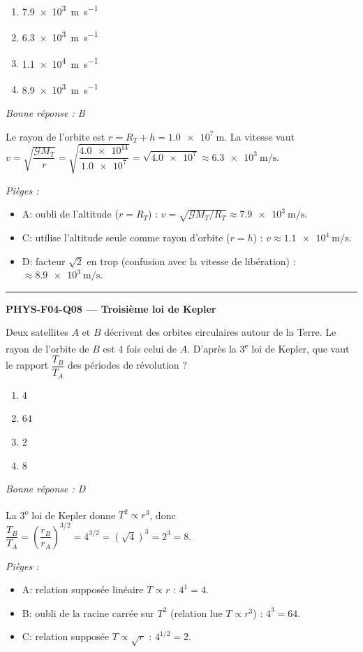 \documentclass[11pt,a4paper]{article}
\begin{document}
\begin{enumerate}[label=\Alph*)]
\item \qty{7.9e3}{\metre\per\second}
\item \qty{6.3e3}{\metre\per\second}
\item \qty{1.1e4}{\metre\per\second}
\item \qty{8.9e3}{\metre\per\second}
\end{enumerate}
\textit{Bonne réponse : B}\par
Le rayon de l'orbite est $r=R_T+h=\qty{1.0e7}{\metre}$. La vitesse vaut $v=\sqrt{\dfrac{\mathcal{G}M_T}{r}}=\sqrt{\dfrac{\num{4.0e14}}{\num{1.0e7}}}=\sqrt{\num{4.0e7}}\approx\qty{6.3e3}{\metre\per\second}$.\par
\textit{Pièges :}
\begin{itemize}
\item A: oubli de l'altitude ($r=R_T$) : $v=\sqrt{\mathcal{G}M_T/R_T}\approx\qty{7.9e3}{\metre\per\second}$.
\item C: utilise l'altitude seule comme rayon d'orbite ($r=h$) : $v\approx\qty{1.1e4}{\metre\per\second}$.
\item D: facteur $\sqrt{2}$ en trop (confusion avec la vitesse de libération) : $\approx\qty{8.9e3}{\metre\per\second}$.
\end{itemize}
\vspace{8pt}\hrule\vspace{8pt}
\noindent\textbf{PHYS-F04-Q08 --- Troisième loi de Kepler}\par
Deux satellites $A$ et $B$ décrivent des orbites circulaires autour de la Terre. Le rayon de l'orbite de $B$ est $4$ fois celui de $A$. D'après la 3\textsuperscript{e} loi de Kepler, que vaut le rapport $\dfrac{T_B}{T_A}$ des périodes de révolution ?
\begin{enumerate}[label=\Alph*)]
\item $4$
\item $64$
\item $2$
\item $8$
\end{enumerate}
\textit{Bonne réponse : D}\par
La 3\textsuperscript{e} loi de Kepler donne $T^2\propto r^3$, donc $\dfrac{T_B}{T_A}=\left(\dfrac{r_B}{r_A}\right)^{3/2}=4^{3/2}=(\sqrt{4})^3=2^3=8$.\par
\textit{Pièges :}
\begin{itemize}
\item A: relation supposée linéaire $T\propto r$ : $4^1=4$.
\item B: oubli de la racine carrée sur $T^2$ (relation lue $T\propto r^3$) : $4^3=64$.
\item C: relation supposée $T\propto\sqrt{r}$ : $4^{1/2}=2$.
\end{itemize}
\end{document}
